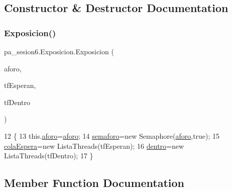 \subsection{Constructor \& Destructor Documentation}
\mbox{\label{classpa__sesion6_1_1_exposicion_ac2ed6ee34e37947b14312bf2cd826478}} 
\subsubsection{\texorpdfstring{Exposicion()}{Exposicion()}}
{\footnotesize\ttfamily pa\+\_\+sesion6.\+Exposicion.\+Exposicion (\begin{DoxyParamCaption}\item[{int}]{aforo,  }\item[{J\+Text\+Field}]{tf\+Esperan,  }\item[{J\+Text\+Field}]{tf\+Dentro }\end{DoxyParamCaption})\hspace{0.3cm}{\ttfamily [inline]}}


\begin{DoxyCode}
12     \{
13         this.\mbox{\hyperlink{classpa__sesion6_1_1_exposicion_afcbdc68d946761e186c8403f72a868f5}{aforo}}=\mbox{\hyperlink{classpa__sesion6_1_1_exposicion_afcbdc68d946761e186c8403f72a868f5}{aforo}};
14         \mbox{\hyperlink{classpa__sesion6_1_1_exposicion_a85f365853b70ab8959d994128fd1b30a}{semaforo}}=\textcolor{keyword}{new} Semaphore(\mbox{\hyperlink{classpa__sesion6_1_1_exposicion_afcbdc68d946761e186c8403f72a868f5}{aforo}},\textcolor{keyword}{true});
15         \mbox{\hyperlink{classpa__sesion6_1_1_exposicion_a3bf69f7216a0de4d66e64da055479f16}{colaEspera}}=\textcolor{keyword}{new} ListaThreads(tfEsperan);
16         \mbox{\hyperlink{classpa__sesion6_1_1_exposicion_ab6a124ffce7020f2703c668f813c557a}{dentro}}=\textcolor{keyword}{new} ListaThreads(tfDentro);
17     \}
\end{DoxyCode}


\subsection{Member Function Documentation}
\mbox{\label{classpa__sesion6_1_1_exposicion_a290de0143a4ac3d4144b59da8998590f}} 
